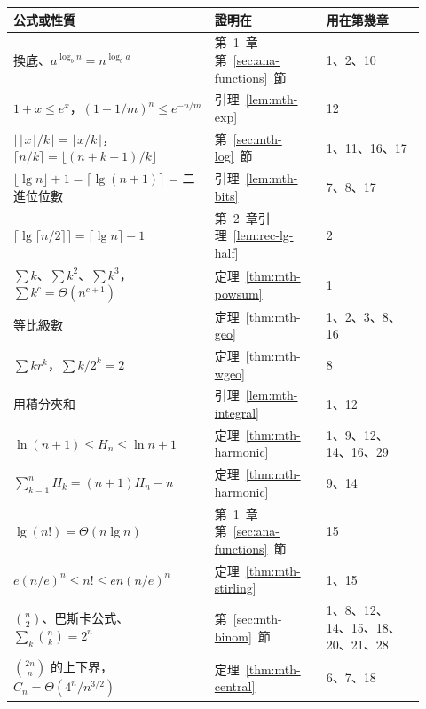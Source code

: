 \begin{center}
\small
\begin{tabular}{p{0.45\linewidth}p{0.25\linewidth}p{0.22\linewidth}}
\toprule
公式或性質 & 證明在 & 用在第幾章 \\
\midrule
換底、$a^{\log_b n} = n^{\log_b a}$ & 第~1~章第~\ref{sec:ana-functions}~節 & 1、2、10 \\
$1 + x \le e^x$，$(1 - 1/m)^n \le e^{-n/m}$ & 引理~\ref{lem:mth-exp} & 12 \\
$\lfloor \lfloor x \rfloor / k \rfloor = \lfloor x/k \rfloor$，$\lceil n/k \rceil =
\lfloor (n + k - 1)/k \rfloor$ & 第~\ref{sec:mth-log}~節 & 1、11、16、17 \\
$\lfloor \lg n \rfloor + 1 = \lceil \lg(n+1) \rceil$ = 二進位位數 & 引理~\ref{lem:mth-bits} &
7、8、17 \\
$\lceil \lg \lceil n/2 \rceil \rceil = \lceil \lg n \rceil - 1$ & 第~2~章引理~\ref{lem:rec-lg-half}
& 2 \\
$\sum k$、$\sum k^2$、$\sum k^3$，$\sum k^c = \Theta(n^{c+1})$ & 定理~\ref{thm:mth-powsum} & 1 \\
等比級數 & 定理~\ref{thm:mth-geo} & 1、2、3、8、16 \\
$\sum k r^k$，$\sum k/2^k = 2$ & 定理~\ref{thm:mth-wgeo} & 8 \\
用積分夾和 & 引理~\ref{lem:mth-integral} & 1、12 \\
$\ln(n+1) \le H_n \le \ln n + 1$ & 定理~\ref{thm:mth-harmonic} & 1、9、12、14、16、29 \\
$\sum_{k=1}^{n} H_k = (n+1)H_n - n$ & 定理~\ref{thm:mth-harmonic} & 9、14 \\
$\lg(n!) = \Theta(n \lg n)$ & 第~1~章第~\ref{sec:ana-functions}~節 & 15 \\
$e(n/e)^n \le n! \le en(n/e)^n$ & 定理~\ref{thm:mth-stirling} & 1、15 \\
$\binom{n}{2}$、巴斯卡公式、$\sum_k \binom{n}{k} = 2^n$ & 第~\ref{sec:mth-binom}~節 &
1、8、12、14、15、18、20、21、28 \\
$\binom{2n}{n}$ 的上下界，$C_n = \Theta(4^n / n^{3/2})$ & 定理~\ref{thm:mth-central} & 6、7、18 \\
\bottomrule
\end{tabular}
\end{center}

